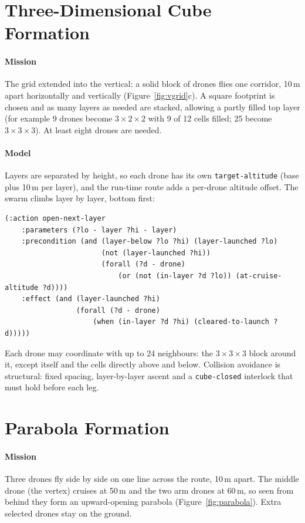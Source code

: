 \documentclass[11pt,a4paper,oneside]{report}
\newcommand{\code}[1]{\texttt{#1}}
\begin{document}
\section{Three-Dimensional Cube Formation}
\paragraph{Mission}
The grid extended into the vertical: a solid block of drones flies one corridor, 10\,m apart
horizontally and vertically (Figure~\ref{fig:vgrid}c). A square footprint is chosen and as many
layers as needed are stacked, allowing a partly filled top layer (for example 9 drones become
$3\times2\times2$ with 9 of 12 cells filled; 25 become $3\times3\times3$). At least eight drones
are needed.

\paragraph{Model}
Layers are separated by height, so each drone has its own \code{target-altitude} (base plus
10\,m per layer), and the run-time route adds a per-drone altitude offset. The swarm climbs
layer by layer, bottom first:

\begin{lstlisting}
(:action open-next-layer
    :parameters (?lo - layer ?hi - layer)
    :precondition (and (layer-below ?lo ?hi) (layer-launched ?lo)
                       (not (layer-launched ?hi))
                       (forall (?d - drone)
                           (or (not (in-layer ?d ?lo)) (at-cruise-altitude ?d))))
    :effect (and (layer-launched ?hi)
                 (forall (?d - drone)
                     (when (in-layer ?d ?hi) (cleared-to-launch ?d)))))
\end{lstlisting}

\noindent Each drone may coordinate with up to 24 neighbours: the $3\times3\times3$ block around
it, except itself and the cells directly above and below. Collision avoidance is structural:
fixed spacing, layer-by-layer ascent and a \code{cube-closed} interlock that must hold before
each leg.

\section{Parabola Formation}
\paragraph{Mission}
Three drones fly side by side on one line across the route, 10\,m apart. The middle drone (the
vertex) cruises at 50\,m and the two arm drones at 60\,m, so seen from behind they form an
upward-opening parabola (Figure~\ref{fig:parabola}). Extra selected drones stay on the ground.
\end{document}
